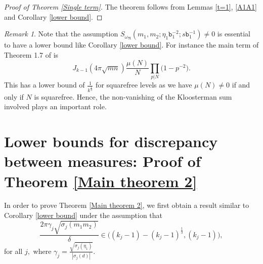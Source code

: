 \documentclass[reqno]{amsart}
\theoremstyle{plain}
\theoremstyle{definition}
\theoremstyle{remark}
\newtheorem{remark}{Remark}
\def\b{\mathtt b}
\begin{document}
 \begin{proof}[Proof of Theorem \ref{Single term}]
 The theorem follows from Lemmas \ref{t=1}, \ref{A1A1} and Corollary \ref{lower bound}.
 \end{proof}
 
\begin{remark}
Note that the assumption $S_{\omega_\mathfrak{N}} ( m_{1}, m_{2};\eta_1 \b_1^{-2};s\b_1^{-1})\neq 0$ is essential to have a lower bound like Corollary \ref{lower bound}. For instance the main term of Theorem 1.7 of \cite{JS} is $$J_{k-1}(4\pi\sqrt{mn})\frac{\mu(N)}{N} \prod_{p|N} \big(1-p^{-2}\big).$$
This has a lower bound of $\frac{1}{k^{\frac{1}{3}}}$ for squarefree levels as we have $\mu(N)\neq 0$ if and only if $N$ is squarefree.  Hence, the non-vanishing of the Kloosterman sum involved plays an important role.
\end{remark}

\section{Lower bounds for discrepancy between measures: Proof of Theorem \ref{Main theorem 2}}\label{sec: proof-Main-theorem-2}

In order to prove Theorem \ref{Main theorem 2}, we first obtain a result  similar to Corollary \ref{lower bound} under the assumption that  
$$\frac{2\pi \gamma_j\sqrt{\sigma_{j}(m_{1}m_{2})}}{\delta}\in \Big((k_{j}  -1)-(k_{j}  -1)^{\frac{1}{3}},(k_{j}  -1)\Big),$$ for all $j,$ where $\gamma_j=\frac{\sqrt{\sigma_j(\eta_1)}}{|\sigma_j(d)|}$. 
\end{document}
